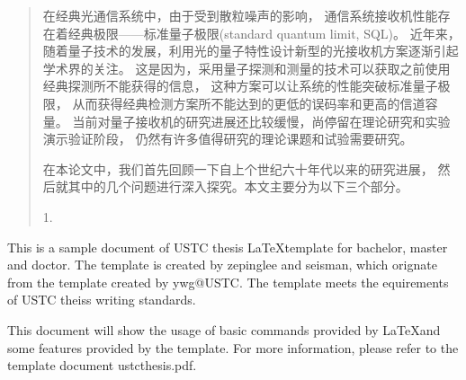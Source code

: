 ﻿\begin{abstract}
在经典光通信系统中，由于受到散粒噪声的影响，
通信系统接收机性能存在着经典极限——标准量子极限(standard quantum limit, SQL)。
近年来，随着量子技术的发展，利用光的量子特性设计新型的光接收机方案逐渐引起学术界的关注。
这是因为，采用量子探测和测量的技术可以获取之前使用经典探测所不能获得的信息，
这种方案可以让系统的性能突破标准量子极限，
从而获得经典检测方案所不能达到的更低的误码率和更高的信道容量。
当前对量子接收机的研究进展还比较缓慢，尚停留在理论研究和实验演示验证阶段，
仍然有许多值得研究的理论课题和试验需要研究。
\par

在本论文中，我们首先回顾一下自上个世纪六十年代以来的研究进展，
然后就其中的几个问题进行深入探究。本文主要分为以下三个部分。

\par

1. 






\end{abstract}

\begin{enabstract}
This is a sample document of USTC thesis \LaTeX template for bachelor, master
and doctor. The template is created by zepinglee and seisman, which orignate from
the template created by ywg@USTC. The template meets the equirements of USTC
theiss writing standards.

This document will show the usage of basic commands provided by \LaTeX and some
features provided by the template. For more information, please refer to the
template document ustcthesis.pdf.

\end{enabstract}
